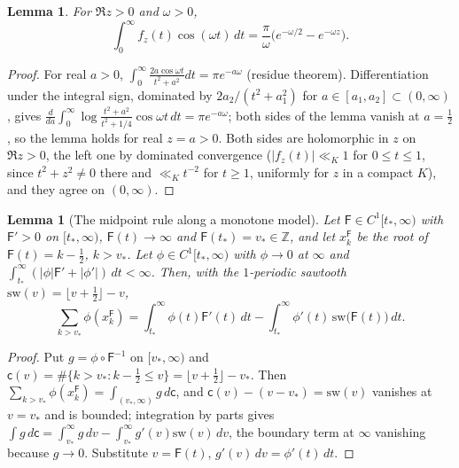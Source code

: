 \documentclass[preprint,12pt]{elsarticle}
\numberwithin{equation}{section}
\theoremstyle{plain}
\newtheorem{lemma}[theorem]{Lemma}
\theoremstyle{definition}
\theoremstyle{remark}
\begin{document}
\begin{lemma}\label{lem:fourier_log}
For $\Re z>0$ and $\omega>0$,
\[
\int_0^\infty f_z(t)\cos(\omega t)\,dt=\frac\pi\omega\bigl(e^{-\omega/2}-e^{-\omega z}\bigr).
\]
\end{lemma}

\begin{proof}
For real $a>0$, $\int_0^\infty\frac{2a\cos\omega t}{t^2+a^2}dt=\pi e^{-a\omega}$ (residue theorem). Differentiation under the integral sign, dominated by $2a_2/(t^2+a_1^2)$ for $a\in[a_1,a_2]\subset(0,\infty)$, gives $\frac d{da}\int_0^\infty\log\frac{t^2+a^2}{t^2+1/4}\cos\omega t\,dt=\pi e^{-a\omega}$; both sides of the lemma vanish at $a=\frac12$, so the lemma holds for real $z=a>0$. Both sides are holomorphic in $z$ on $\Re z>0$, the left one by dominated convergence ($|f_z(t)|\ll_K1$ for $0\le t\le1$, since $t^2+z^2\ne0$ there and $\ll_Kt^{-2}$ for $t\ge1$, uniformly for $z$ in a compact $K$), and they agree on $(0,\infty)$.
\end{proof}

\begin{lemma}[The midpoint rule along a monotone model]\label{lem:midpoint_rule}
Let $\mathsf F\in C^1[t_*,\infty)$ with $\mathsf F'>0$ on $[t_*,\infty)$, $\mathsf F(t)\to\infty$ and $\mathsf F(t_*)=v_*\in\mathbb Z$, and let $x_k^{\mathsf F}$ be the root of $\mathsf F(t)=k-\frac12$, $k>v_*$. Let $\phi\in C^1[t_*,\infty)$ with $\phi\to0$ at $\infty$ and $\int_{t_*}^\infty(|\phi|\mathsf F'+|\phi'|)\,dt<\infty$. Then, with the $1$-periodic sawtooth $\mathrm{sw}(v)=\lfloor v+\frac12\rfloor-v$,
\[
\sum_{k>v_*}\phi(x_k^{\mathsf F})=\int_{t_*}^\infty\phi(t)\mathsf F'(t)\,dt-\int_{t_*}^\infty\phi'(t)\,\mathrm{sw}\bigl(\mathsf F(t)\bigr)\,dt .
\]
\end{lemma}

\begin{proof}
Put $g=\phi\circ\mathsf F^{-1}$ on $[v_*,\infty)$ and $\mathsf c(v)=\#\{k>v_*:k-\frac12\le v\}=\lfloor v+\frac12\rfloor-v_*$. Then $\sum_{k>v_*}\phi(x_k^{\mathsf F})=\int_{(v_*,\infty)}g\,d\mathsf c$, and $\mathsf c(v)-(v-v_*)=\mathrm{sw}(v)$ vanishes at $v=v_*$ and is bounded; integration by parts gives $\int g\,d\mathsf c=\int_{v_*}^\infty g\,dv-\int_{v_*}^\infty g'(v)\mathrm{sw}(v)\,dv$, the boundary term at $\infty$ vanishing because $g\to0$. Substitute $v=\mathsf F(t)$, $g'(v)\,dv=\phi'(t)\,dt$.
\end{proof}
\end{document}

